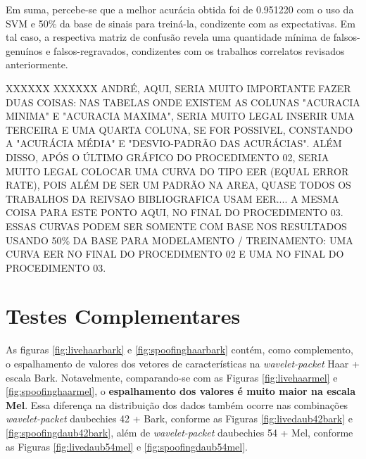 	    \par Em suma, percebe-se que a melhor acurácia obtida foi de 0.951220 com o uso da SVM e 50\% da base de sinais para treiná-la, condizente com as expectativas. Em tal caso, a respectiva matriz de confusão revela uma quantidade mínima de falsos-genuínos e falsos-regravados, condizentes com os trabalhos correlatos revisados anteriormente. 
	    
	    
	    \par XXXXXX XXXXXX ANDRÉ, AQUI, SERIA MUITO IMPORTANTE FAZER DUAS COISAS: NAS TABELAS ONDE EXISTEM AS COLUNAS "ACURACIA MINIMA" E "ACURACIA MAXIMA", SERIA MUITO LEGAL INSERIR UMA TERCEIRA E UMA QUARTA COLUNA, SE FOR POSSIVEL, CONSTANDO A "ACURÁCIA MÉDIA" E "DESVIO-PADRÃO DAS ACURÁCIAS". ALÉM DISSO, APÓS O ÚLTIMO GRÁFICO DO PROCEDIMENTO 02, SERIA MUITO LEGAL COLOCAR UMA CURVA DO TIPO EER (EQUAL ERROR RATE), POIS ALÉM DE SER UM PADRÃO NA AREA, QUASE TODOS OS TRABALHOS DA REIVSAO BIBLIOGRAFICA USAM EER.... A MESMA COISA PARA ESTE PONTO AQUI, NO FINAL DO PROCEDIMENTO 03. ESSAS CURVAS PODEM SER SOMENTE COM BASE NOS RESULTADOS USANDO 50\% DA BASE PARA MODELAMENTO / TREINAMENTO: UMA CURVA EER NO FINAL DO PROCEDIMENTO 02 E UMA NO FINAL DO  PROCEDIMENTO 03.
	
	\section{Testes Complementares}
	\label{chap:testsResults:sec:Experimento05}
		As figuras \ref{fig:livehaarbark} e \ref{fig:spoofinghaarbark} contém, como complemento, o espalhamento de valores dos vetores de características na \textit{wavelet-packet} Haar + escala Bark. Notavelmente, comparando-se com as Figuras \ref{fig:livehaarmel} e \ref{fig:spoofinghaarmel}, o \textbf{espalhamento dos valores é muito maior na escala \textbf{Mel}}. Essa diferença na distribuição dos dados também ocorre nas combinações \textit{wavelet-packet} daubechies 42 + Bark, conforme as Figuras \ref{fig:livedaub42bark} e \ref{fig:spoofingdaub42bark}, além de \textit{wavelet-packet} daubechies 54 + Mel, conforme as Figuras \ref{fig:livedaub54mel} e \ref{fig:spoofingdaub54mel}.
		
